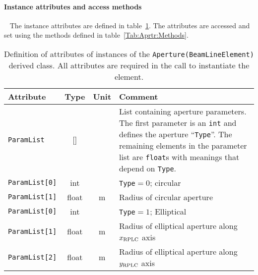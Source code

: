 \paragraph{Instance attributes and access methods} ~\newline
\label{SubSubSect:Aprtr:InstAttr}
\noindent
The instance attributes are defined in
table~\ref{Tab:Aprtr:Attributes}. 
The attributes are accessed and set using the methods defined in
table~\ref{Tab:Aprtr:Methods}.
\begin{table}[h]
  \caption{
    Definition of attributes of instances of
    the \texttt{Aperture(BeamLineElement)} derived class.
    All attributes are required in the call to instantiate the
    element.
  }
  \label{Tab:Aprtr:Attributes}
  \begin{center}
    \begin{tabular}{|l|c|c|p{10cm}|}
      \hline
      \textbf{Attribute}   & \textbf{Type} & \textbf{Unit} & \textbf{Comment}                                                                   \\
      \hline
      \texttt{ParamList}   & [] &   & List containing aperture parameters.
                                    The first parameter is an \texttt{int}
                                    and defines the aperture ``\texttt{Type}''.
                                    The remaining elements in the parameter list
                                    are \texttt{float}s with meanings that depend
                                    on \texttt{Type}.                             \\
      \hline
      \texttt{ParamList[0]} & int   &   & \texttt{Type}$=0$; circular                 \\
      \texttt{ParamList[1]} & float & m & Radius of circular aperture                 \\
      \hline
      \texttt{ParamList[0]} & int   &   & \texttt{Type}$=1$; Elliptical                           \\
      \texttt{ParamList[1]} & float & m & Radius of elliptical aperture along $x_{\rm RPLC}$ axis \\
      \texttt{ParamList[2]} & float & m & Radius of elliptical aperture along $y_{\rm RPLC}$ axis \\
      \hline
    \end{tabular}
  \end{center}
\end{table}
